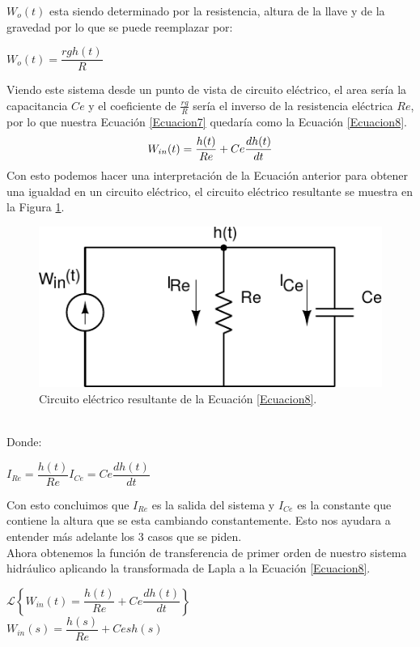 \documentclass[12pt,a4paper]{article}
\begin{document}
$W_{o}(t)$ esta siendo determinado por la resistencia, altura de la llave y de la gravedad por lo que se puede reemplazar por:
\begin{center}
$W_{o}(t) = \dfrac{rgh(t)}{R}$
\end{center}
Viendo este sistema desde un punto de vista de circuito eléctrico, el area sería la capacitancia $Ce$ y el coeficiente de $\frac{rg}{R}$ sería el inverso de la resistencia eléctrica $Re$, por lo que nuestra Ecuación \ref{Ecuacion7} quedaría como la Ecuación \ref{Ecuacion8}.
\begin{equation}
\centering
W_{in}(t) = \dfrac{h(t)}{Re} + Ce\dfrac{dh(t)}{dt}
\label{Ecuacion8}
\end{equation}
Con esto podemos hacer una interpretación de la Ecuación anterior para obtener una igualdad en un circuito eléctrico, el circuito eléctrico resultante se muestra en la Figura \ref{Figura2}.\\
\begin{figure}[h!]
\centering
\includegraphics[scale=1]{Circuito.pdf}
\caption{Circuito eléctrico resultante de la Ecuación \ref{Ecuacion8}.}
\label{Figura2}
\end{figure}\\
Donde:
\begin{center}
$I_{Re}=\dfrac{h(t)}{Re}$\hspace{5cm}$I_{Ce}=Ce\dfrac{dh(t)}{dt}$
\end{center}
Con esto concluimos que $I_{Re}$ es la salida del sistema y $I_{Ce}$ es la constante que contiene la altura que se esta cambiando constantemente. Esto nos ayudara a entender más adelante los 3 casos que se piden.\\[12pt]
Ahora obtenemos la función de transferencia de primer orden de nuestro sistema hidráulico aplicando la transformada de Lapla a la Ecuación \ref{Ecuacion8}.
\begin{center}
$\mathcal{L}\left\lbrace W_{in}(t) = \dfrac{h(t)}{Re} + Ce\dfrac{dh(t)}{dt} \right\rbrace$\\[15pt]
$W_{in}(s) = \dfrac{h(s)}{Re} + Cesh(s)$
\end{center}
\end{document}
